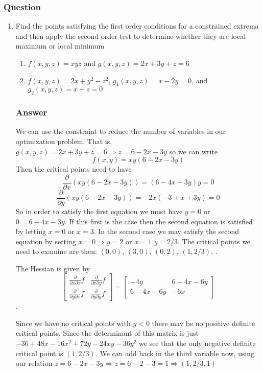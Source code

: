 \documentclass[12pt]{article}
\begin{document}
\subsubsection{Question}
\begin{enumerate}
\item Find the points satisfying the first order conditions for a constrained extrema and then apply the second order test to determine whether they are local maximum or local minimum
\begin{enumerate}
\item $f(x,y,z)=xyz$ and $g(x,y,z)=2x+3y+z=6$
\item $f(x,y,z)=2x+y^2-z^2$, $g_1(x,y,z)=x-2y=0$, and $g_2(x,y,z)=x+z=0$
\end{enumerate}
\subsubsection{Answer}
We can use the constraint to reduce the number of variables in our optimization problem. That is,
$g(x,y,z)=2x+3y+z=6 \Rightarrow z = 6-2x-3y$ so we can write 
\[ f(x,y)= xy (6-2x-3y )\]
Then the critical points need to have  
\[\frac{\partial }{\partial x} (xy (6-2x-3y ))= (6-4 x-3 y) y =0\]
\[\frac{\partial }{\partial y} (xy (6-2x-3y ))= -2 x (-3+x+3 y) =0\]
So in order to satisfy the first equation we must have $y=0$ or $0=6-4x-3y$. If this first is the case then the second equation is satisfied by letting $x=0$ or $x=3$. In the second case we may satisfy the second equation by setting $x=0 \Rightarrow y=2$ or $x=1$ $y=2/3$. The critical points we need to examine are then: $(0,0)$, $(3,0)$, $(0,2)$, $(1,2/3)$, .

The Hessian is given by 
\[
\left[
\begin{array}{lr}
\frac{\partial}{\partial x \partial x} f&\frac{\partial}{\partial x \partial y} f\\
\frac{\partial}{\partial y \partial x} f&\frac{\partial}{\partial y \partial y} f
\end{array}\right]
=
\left[
\begin{array}{lr}
-4 y &6-4 x-6 y\\
6-4 x-6 y&-6x
\end{array}\right]
\].

Since we have no critical points with $y<0$ there may be no positive definite critical points. Since the determinant of this matrix is just $-36+48 x-16 x^2+72 y-24 x y-36 y^2$ we see that the only negative definite critical point is $(1,2/3)$. We can add back in the third variable now, using our relation $z=6-2x-3y \Rightarrow z= 6-2-3=1 \Rightarrow (1,2/3,1)$


\end{enumerate}
\end{document}
